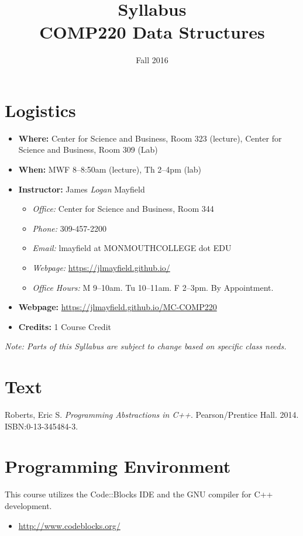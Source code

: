 \documentclass[nobib]{tufte-handout}
\title{Syllabus \\ COMP220 Data Structures}
\author{}
\date{Fall 2016}
\begin{document}
\maketitle

\section{Logistics}
\begin{itemize}
\item \textbf{Where: } Center for Science and Business, Room 323 (lecture), Center for Science and Business, Room 309 (Lab)
\item \textbf{When: } MWF 8--8:50am (lecture), Th 2--4pm (lab)
\item \textbf{Instructor: } James \textit{Logan} Mayfield
\begin{itemize}
\item \textit{Office: } Center for Science and Business, Room 344
\item \textit{Phone: } 309-457-2200 %
\item \textit{Email: } lmayfield at MONMOUTHCOLLEGE dot EDU
\item \textit{Webpage: } \url{https://jlmayfield.github.io/}
\item \textit{Office Hours: }   M 9--10am. Tu 10--11am. F 2--3pm. By Appointment.
\end{itemize}
\item \textbf{Webpage: } \url{https://jlmayfield.github.io/MC-COMP220}
\item \textbf{Credits: } 1 Course Credit
\end{itemize}
\emph{Note: Parts of this Syllabus are subject to change based on specific class needs.}

\section{Text}

\noindent
Roberts, Eric S\@. \textit{Programming Abstractions in C++}. Pearson/Prentice Hall. 2014. ISBN:0-13-345484-3. %

\section{Programming Environment}

This course utilizes the Code::Blocks IDE and the GNU compiler for C++ development.
\begin{itemize}
\item \url{http://www.codeblocks.org/}
\end{itemize}
\end{document}
